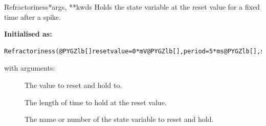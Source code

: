 \documentclass[letterpaper,10pt,english]{manual}
\begin{document}
\hypertarget{brian.Refractoriness}{}\begin{classdesc}{Refractoriness}{*args, **kwds}
Holds the state variable at the reset value for a fixed time after a spike.

\textbf{Initialised as:}

\begin{Verbatim}[commandchars=@\[\]]
Refractoriness(@PYGZlb[]resetvalue=0*mV@PYGZlb[],period=5*ms@PYGZlb[],state=0@PYGZrb[]@PYGZrb[]@PYGZrb[])
\end{Verbatim}

with arguments:
\begin{description}
\item[]
The value to reset and hold to.

\item[]
The length of time to hold at the reset value.

\item[]
The name or number of the state variable to reset and hold.

\end{description}
\end{classdesc}
\end{document}
